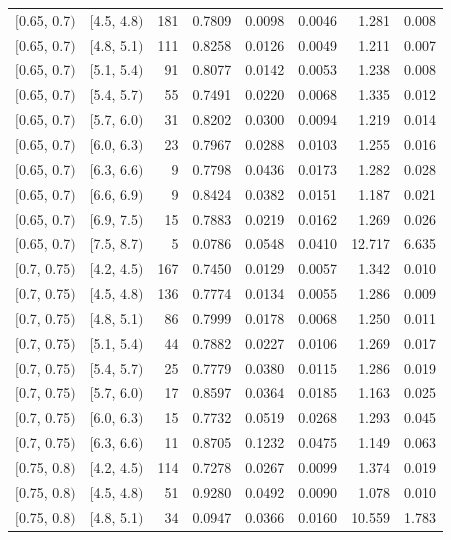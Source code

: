 \documentclass[11pt]{article}
\begin{document}
\begin{longtable}{| l | l | r | r | r | r | r | r |}
        $[$0.65, 0.7$)$ & $[$4.5, 4.8$)$ & 181 & 0.7809 & 0.0098 & 0.0046 & 1.281 & 0.008 \\
        $[$0.65, 0.7$)$ & $[$4.8, 5.1$)$ & 111 & 0.8258 & 0.0126 & 0.0049 & 1.211 & 0.007 \\
        $[$0.65, 0.7$)$ & $[$5.1, 5.4$)$ & 91 & 0.8077 & 0.0142 & 0.0053 & 1.238 & 0.008 \\
        $[$0.65, 0.7$)$ & $[$5.4, 5.7$)$ & 55 & 0.7491 & 0.0220 & 0.0068 & 1.335 & 0.012 \\
        $[$0.65, 0.7$)$ & $[$5.7, 6.0$)$ & 31 & 0.8202 & 0.0300 & 0.0094 & 1.219 & 0.014 \\
        $[$0.65, 0.7$)$ & $[$6.0, 6.3$)$ & 23 & 0.7967 & 0.0288 & 0.0103 & 1.255 & 0.016 \\
        $[$0.65, 0.7$)$ & $[$6.3, 6.6$)$ & 9 & 0.7798 & 0.0436 & 0.0173 & 1.282 & 0.028 \\
        $[$0.65, 0.7$)$ & $[$6.6, 6.9$)$ & 9 & 0.8424 & 0.0382 & 0.0151 & 1.187 & 0.021 \\
        $[$0.65, 0.7$)$ & $[$6.9, 7.5$)$ & 15 & 0.7883 & 0.0219 & 0.0162 & 1.269 & 0.026 \\
        $[$0.65, 0.7$)$ & $[$7.5, 8.7$)$ & 5 & 0.0786 & 0.0548 & 0.0410 & 12.717 & 6.635 \\
        $[$0.7, 0.75$)$ & $[$4.2, 4.5$)$ & 167 & 0.7450 & 0.0129 & 0.0057 & 1.342 & 0.010 \\
        $[$0.7, 0.75$)$ & $[$4.5, 4.8$)$ & 136 & 0.7774 & 0.0134 & 0.0055 & 1.286 & 0.009 \\
        $[$0.7, 0.75$)$ & $[$4.8, 5.1$)$ & 86 & 0.7999 & 0.0178 & 0.0068 & 1.250 & 0.011 \\
        $[$0.7, 0.75$)$ & $[$5.1, 5.4$)$ & 44 & 0.7882 & 0.0227 & 0.0106 & 1.269 & 0.017 \\
        $[$0.7, 0.75$)$ & $[$5.4, 5.7$)$ & 25 & 0.7779 & 0.0380 & 0.0115 & 1.286 & 0.019 \\
        $[$0.7, 0.75$)$ & $[$5.7, 6.0$)$ & 17 & 0.8597 & 0.0364 & 0.0185 & 1.163 & 0.025 \\
        $[$0.7, 0.75$)$ & $[$6.0, 6.3$)$ & 15 & 0.7732 & 0.0519 & 0.0268 & 1.293 & 0.045 \\
        $[$0.7, 0.75$)$ & $[$6.3, 6.6$)$ & 11 & 0.8705 & 0.1232 & 0.0475 & 1.149 & 0.063 \\
        $[$0.75, 0.8$)$ & $[$4.2, 4.5$)$ & 114 & 0.7278 & 0.0267 & 0.0099 & 1.374 & 0.019 \\
        $[$0.75, 0.8$)$ & $[$4.5, 4.8$)$ & 51 & 0.9280 & 0.0492 & 0.0090 & 1.078 & 0.010 \\
        $[$0.75, 0.8$)$ & $[$4.8, 5.1$)$ & 34 & 0.0947 & 0.0366 & 0.0160 & 10.559 & 1.783 \\
\end{longtable}
\end{document}
